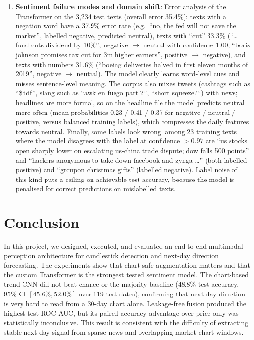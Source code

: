 \documentclass[10pt,journal]{IEEEtran}
\begin{document}
\begin{enumerate}
  \item \textbf{Sentiment failure modes and domain shift}:
  Error analysis of the Transformer on the 3,234 test texts (overall error 35.4\%): texts with a negation word have a 37.9\% error rate (e.g.\ ``no, the fed will not save the market'', labelled negative, predicted neutral), texts with ``cut'' 33.3\% (``\ldots fund cuts dividend by 10\%'', negative $\rightarrow$ neutral with confidence 1.00; ``boris johnson promises tax cut for 3m higher earners'', positive $\rightarrow$ negative), and texts with numbers 31.6\% (``boeing deliveries halved in first eleven months of 2019'', negative $\rightarrow$ neutral). The model clearly learns word-level cues and misses sentence-level meaning. The corpus also mixes tweets (cashtags such as ``\$ddf'', slang such as ``awk en fuego part 2'', ``short squeeze?'') with news; headlines are more formal, so on the headline file the model predicts neutral more often (mean probabilities 0.23 / 0.41 / 0.37 for negative / neutral / positive, versus balanced training labels), which compresses the daily features towards neutral. Finally, some labels look wrong: among 23 training texts where the model disagrees with the label at confidence $> 0.97$ are ``us stocks open sharply lower on escalating us-china trade dispute; dow falls 500 points'' and ``hackers anonymous to take down facebook and zynga \ldots'' (both labelled positive) and ``groupon christmas gifts'' (labelled negative). Label noise of this kind puts a ceiling on achievable test accuracy, because the model is penalised for correct predictions on mislabelled texts.
\end{enumerate}

\section{Conclusion}
\label{sec:conclusion}
In this project, we designed, executed, and evaluated an end-to-end multimodal perception architecture for candlestick detection and next-day direction forecasting. The experiments show that chart-safe augmentation matters and that the custom Transformer is the strongest tested sentiment model. The chart-based trend CNN did not beat chance or the majority baseline (48.8\% test accuracy, 95\% CI $[45.6\%, 52.0\%]$ over 119 test dates), confirming that next-day direction is very hard to read from a 30-day chart alone. Leakage-free fusion produced the highest test ROC-AUC, but its paired accuracy advantage over price-only was statistically inconclusive. This result is consistent with the difficulty of extracting stable next-day signal from sparse news and overlapping market-chart windows.
\end{document}
